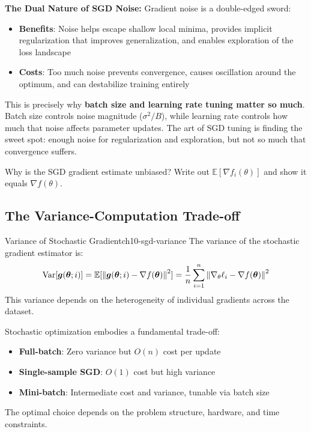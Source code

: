 \documentclass[../../main.tex]{subfiles}
\begin{document}
\begin{keyconcept}
\textbf{The Dual Nature of SGD Noise:} Gradient noise is a double-edged sword:
\begin{itemize}
    \item \textbf{Benefits}: Noise helps escape shallow local minima, provides implicit regularization that improves generalization, and enables exploration of the loss landscape
    \item \textbf{Costs}: Too much noise prevents convergence, causes oscillation around the optimum, and can destabilize training entirely
\end{itemize}
This is precisely why \textbf{batch size and learning rate tuning matter so much}. Batch size controls noise magnitude ($\sigma^2/B$), while learning rate controls how much that noise affects parameter updates. The art of SGD tuning is finding the sweet spot: enough noise for regularization and exploration, but not so much that convergence suffers.
\end{keyconcept}

\begin{checkpoint}
Why is the SGD gradient estimate unbiased? Write out $\mathbb{E}[\nabla f_i(\theta)]$ and show it equals $\nabla f(\theta)$.
\end{checkpoint}

\subsection{The Variance-Computation Trade-off}

\begin{theorem}{Variance of Stochastic Gradient}{ch10-sgd-variance}
The variance of the stochastic gradient estimator is:
\[
    \operatorname{Var}[\boldsymbol{g}(\boldsymbol{\theta}; i)] = \operatorname{\mathbb{E}}[\left\lVert \boldsymbol{g}(\boldsymbol{\theta}; i) - \nabla f(\boldsymbol{\theta}) \right\rVert^2] = \frac{1}{n}\sum_{i=1}^{n} \left\lVert \nabla_\theta \ell_i - \nabla f(\boldsymbol{\theta}) \right\rVert^2
\]
This variance depends on the heterogeneity of individual gradients across the dataset.
\end{theorem}

\begin{principle}
Stochastic optimization embodies a fundamental trade-off:
\begin{itemize}
    \item \textbf{Full-batch}: Zero variance but $O(n)$ cost per update
    \item \textbf{Single-sample SGD}: $O(1)$ cost but high variance
    \item \textbf{Mini-batch}: Intermediate cost and variance, tunable via batch size
\end{itemize}
The optimal choice depends on the problem structure, hardware, and time constraints.
\end{principle}
\end{document}
